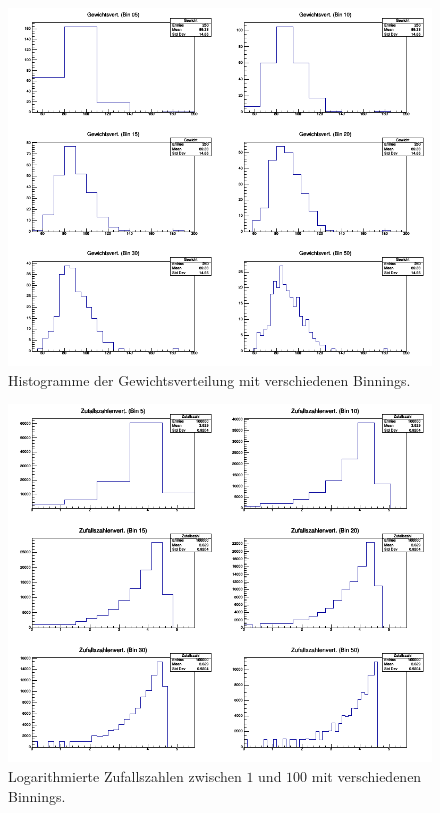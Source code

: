 \begin{itemize}
\begin{figure}
\centering
\includegraphics[width=\textwidth]{GewichtsverteilungBinnings2x3.png}
\caption{Histogramme der Gewichtsverteilung mit verschiedenen Binnings.}
\end{figure}

\begin{figure}
\centering
\includegraphics[width=\textwidth]{Log_ZufallszahlenverteilungBinnings2x3.png}
\caption{Logarithmierte Zufallszahlen zwischen $1$ und $100$ mit verschiedenen Binnings.}
\end{figure}

\end{itemize}

